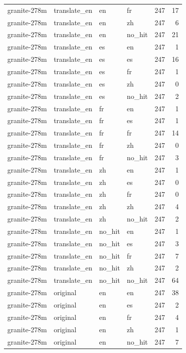 \begin{tabular}{llllrr}
granite-278m & translate\_en & en & fr & 247 & 17 \\
granite-278m & translate\_en & en & zh & 247 & 6 \\
granite-278m & translate\_en & en & no\_hit & 247 & 21 \\
granite-278m & translate\_en & es & en & 247 & 1 \\
granite-278m & translate\_en & es & es & 247 & 16 \\
granite-278m & translate\_en & es & fr & 247 & 1 \\
granite-278m & translate\_en & es & zh & 247 & 0 \\
granite-278m & translate\_en & es & no\_hit & 247 & 2 \\
granite-278m & translate\_en & fr & en & 247 & 1 \\
granite-278m & translate\_en & fr & es & 247 & 1 \\
granite-278m & translate\_en & fr & fr & 247 & 14 \\
granite-278m & translate\_en & fr & zh & 247 & 0 \\
granite-278m & translate\_en & fr & no\_hit & 247 & 3 \\
granite-278m & translate\_en & zh & en & 247 & 1 \\
granite-278m & translate\_en & zh & es & 247 & 0 \\
granite-278m & translate\_en & zh & fr & 247 & 0 \\
granite-278m & translate\_en & zh & zh & 247 & 4 \\
granite-278m & translate\_en & zh & no\_hit & 247 & 2 \\
granite-278m & translate\_en & no\_hit & en & 247 & 1 \\
granite-278m & translate\_en & no\_hit & es & 247 & 3 \\
granite-278m & translate\_en & no\_hit & fr & 247 & 7 \\
granite-278m & translate\_en & no\_hit & zh & 247 & 2 \\
granite-278m & translate\_en & no\_hit & no\_hit & 247 & 64 \\
granite-278m & original & en & en & 247 & 38 \\
granite-278m & original & en & es & 247 & 2 \\
granite-278m & original & en & fr & 247 & 4 \\
granite-278m & original & en & zh & 247 & 1 \\
granite-278m & original & en & no\_hit & 247 & 7 \\

\end{tabular}

